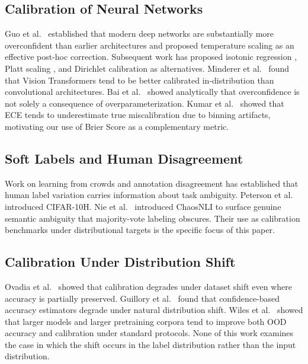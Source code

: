 \documentclass[11pt,a4paper]{article}
\theoremstyle{definition}
\begin{document}
\subsection{Calibration of Neural Networks}

Guo et al.\ \cite{Guo2017} established that modern deep networks are
substantially more overconfident than earlier architectures and proposed
temperature scaling as an effective post-hoc correction. Subsequent work
has proposed isotonic regression \cite{Zadrozny2002}, Platt scaling
\cite{Platt1999}, and Dirichlet calibration \cite{Kull2019} as
alternatives. Minderer et al.\ \cite{Minderer2021} found that Vision
Transformers tend to be better calibrated in-distribution than
convolutional architectures. Bai et al.\ \cite{Bai2021} showed
analytically that overconfidence is not solely a consequence of
overparameterization. Kumar et al.\ \cite{Kumar2019} showed that ECE
tends to underestimate true miscalibration due to binning artifacts,
motivating our use of Brier Score as a complementary metric.

\subsection{Soft Labels and Human Disagreement}

Work on learning from crowds \cite{Raykar2010} and annotation
disagreement \cite{Aroyo2015} has established that human label variation
carries information about task ambiguity. Peterson et al.\
\cite{Peterson2019} introduced CIFAR-10H. Nie et al.\ \cite{Nie2020}
introduced ChaosNLI to surface genuine semantic ambiguity that
majority-vote labeling obscures. Their use as calibration benchmarks
under distributional targets is the specific focus of this paper.

\subsection{Calibration Under Distribution Shift}

Ovadia et al.\ \cite{Ovadia2019} showed that calibration degrades under
dataset shift even where accuracy is partially preserved. Guillory et
al.\ \cite{Guillory2021} found that confidence-based accuracy estimators
degrade under natural distribution shift. Wiles et al.\ \cite{Wiles2022}
showed that larger models and larger pretraining corpora tend to improve
both OOD accuracy and calibration under standard protocols. None of this
work examines the case in which the shift occurs in the label
distribution rather than the input distribution.
\end{document}
